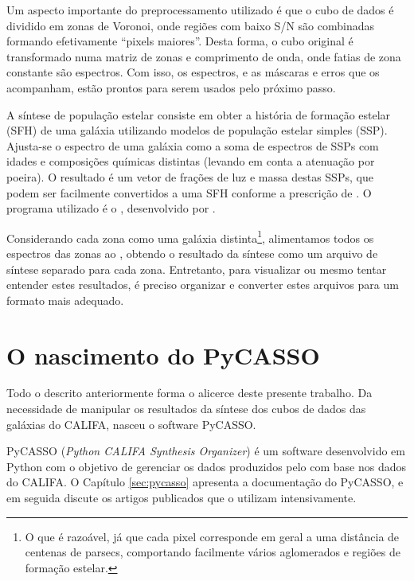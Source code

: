
Um aspecto importante do preprocessamento utilizado é que o cubo de dados é
dividido em zonas de Voronoi, onde regiões com baixo S/N são combinadas formando
efetivamente ``pixels maiores''. Desta forma, o cubo original é transformado
numa matriz de zonas e comprimento de onda, onde fatias de zona constante são
espectros. Com isso, os espectros, e as máscaras e erros que os acompanham,
estão prontos para serem usados pelo próximo passo.

A síntese de população estelar consiste em obter a história de formação estelar
(SFH) de uma galáxia utilizando modelos de população estelar simples (SSP).
Ajusta-se o espectro de uma galáxia como a soma de espectros de SSPs com idades
e composições químicas distintas (levando em conta a atenuação por poeira). O
resultado é um vetor de frações de luz e massa destas SSPs, que podem ser
facilmente convertidos a uma SFH conforme a prescrição de \cite{Asari2007}.
O programa utilizado é o \starlight, desenvolvido por \cite{CidFernandes2005}.

Considerando cada zona como uma galáxia distinta\footnote{O que é razoável, já
que cada pixel corresponde em geral a uma distância de centenas de parsecs,
comportando facilmente vários aglomerados e regiões de formação estelar.},
alimentamos todos os espectros das zonas ao \starlight, obtendo o resultado da
síntese como um arquivo de síntese separado para cada zona. Entretanto, para
visualizar ou mesmo tentar entender estes resultados, é preciso organizar e
converter estes arquivos para um formato mais adequado.



\section{O nascimento do PyCASSO}

Todo o descrito anteriormente forma o alicerce deste presente trabalho. Da
necessidade de manipular os resultados da síntese dos cubos de dados das
galáxias do CALIFA, nasceu o software PyCASSO.

PyCASSO ({\em Python CALIFA \starlight Synthesis Organizer}) é um software
desenvolvido em Python com o objetivo de gerenciar os dados produzidos pelo
\starlight com base nos dados do CALIFA. O Capítulo \ref{sec:pycasso} apresenta
a documentação do PyCASSO, e em seguida discute os artigos publicados que o
utilizam intensivamente.


